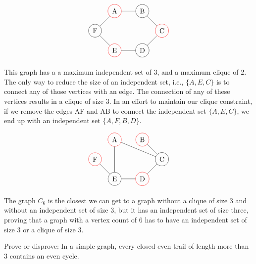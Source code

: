 \documentclass[12pt]{article}
\newenvironment{question}[2][Question]{\begin{trivlist}
\item[\hskip \labelsep {\bfseries #1}\hskip \labelsep {\bfseries #2.}]}{\end{trivlist}}
\begin{document}
\begin{align*}
\begin{tikzpicture}
\node[shape=circle,draw=red] (A) at (1,2) {A};
\node[shape=circle,draw=black] (B) at (2.4142857,2) {B};
\node[shape=circle,draw=red] (C) at (3.4142856,1) {C};
\node[shape=circle,draw=black] (D) at (2.4142857,0) {D};
\node[shape=circle,draw=red] (E) at (1,0) {E};
\node[shape=circle,draw=black] (F) at (0,1) {F};
\path [] (A) edge node[left] {} (B);
\path [] (B) edge node[left] {} (C);
\path [] (C) edge node[left] {} (D);
\path [] (D) edge node[left] {} (E);
\path [] (F) edge node[left] {} (A);
\path [] (E) edge node[left] {} (F);
\end{tikzpicture}
\end{align*}

This graph has a a maximum independent set of 3, and a maximum clique of 2. The only way to reduce the size of an independent set, i.e., $\{A,E,C\}$ is to connect any of those vertices with an edge.  The connection of any of these vertices results in a clique of size 3.  In an effort to maintain our clique constraint, if we remove the edges AF and AB to connect the independent set $\{A,E,C\}$, we end up with an independent set $\{A,F,B, D\}$.

\begin{align*}
\begin{tikzpicture}
\node[shape=circle,draw=red] (A) at (1,2) {A};
\node[shape=circle,draw=red] (B) at (2.4142857,2) {B};
\node[shape=circle,draw=black] (C) at (3.4142856,1) {C};
\node[shape=circle,draw=red] (D) at (2.4142857,0) {D};
\node[shape=circle,draw=black] (E) at (1,0) {E};
\node[shape=circle,draw=red] (F) at (0,1) {F};
\path [] (A) edge node[left] {} (C);
\path [] (B) edge node[left] {} (C);
\path [] (C) edge node[left] {} (D);
\path [] (D) edge node[left] {} (E);
\path [] (E) edge node[left] {} (A);
\path [] (E) edge node[left] {} (F);
\end{tikzpicture}
\end{align*}

The graph $C_6$ is the closest we can get to a graph without a clique of size 3 and without an independent set of size 3, but it has an independent set of size three, proving that a graph with a vertex count of 6 has to have an independent set of size 3 or a clique of size 3.

\begin{question}{2}
Prove or disprove: In a simple graph, every closed even trail of length more than 3 contains an
even cycle.
\end{question}
\end{document}
